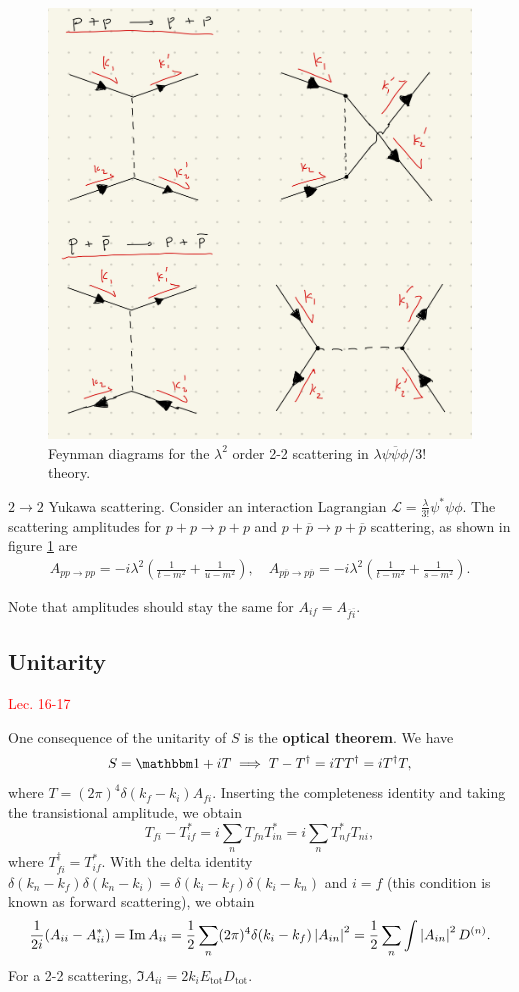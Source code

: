 \documentclass{article}
\begin{document}
\begin{figure}[h]
    \centering
    \includegraphics[width=0.5\linewidth]{images/qft-images/yukawastuchannels.jpg}
    \caption{Feynman diagrams for the $\lambda^2$ order 2-2 scattering in $\lambda\psi\overline\psi\phi/3!$ theory. }
    \label{fig:yukawastuchannels}
\end{figure}

\example $2\to 2$ Yukawa scattering. Consider an interaction Lagrangian $\mathcal L=\frac\lambda{3!}\psi^*\psi\phi$. The scattering amplitudes  for $p+p\to p+p$ and $p+\overline p\to p+\overline p$ scattering, as shown in figure \ref{fig:yukawastuchannels} are 
\begin{align*}
    A_{pp\to pp}=-i\lambda^2\left(\frac 1{t-m^2}+\frac 1{u-m^2}\right),\quad A_{p\overline p\to p\overline p}=-i\lambda^2\left(\frac 1{t-m^2}+\frac 1{s-m^2}\right).
\end{align*}

Note that amplitudes should stay the same for $A_{if}=A_{\overline f\overline i}$.

\subsection{Unitarity}
\textcolor{red}{Lec. 16-17}

One consequence of the unitarity of $S$ is the \textbf{optical theorem}. We have 
$$S=\mathbbm 1+iT\implies T-T^\dag=iTT^\dag=iT^\dag T,$$
where $T=(2\pi)^4\delta(k_f-k_i)A_{fi}.$ Inserting the completeness identity and taking the transistional amplitude, we obtain 
$$T_{fi}-T^*_{if}=i\sum_nT_{fn}T^*_{in}=i\sum_nT^*_{nf}T_{ni},$$
where $T^\dag_{fi}=T^*_{if}$. With the delta identity $\delta(k_n-k_f)\delta(k_n-k_i)=\delta(k_i-k_f)\delta(k_i-k_n)$ and $i=f$ (this condition is known as forward scattering), we obtain
\begin{equation}
    \frac 1{2i}(A_{ii}-A^*_{ii})=\Im A_{ii}=\frac 12\sum_n(2\pi)^4\delta(k_i-k_f)\left\lvert A_{in}\right\rvert^2=\frac 12\sum_n\int\left\lvert A_{in}\right\rvert^2D^{(n)}.
\end{equation}
\example For a 2-2 scattering, $\Im A_{ii}=2k_iE_\text{tot}D_\text{tot}.$
\end{document}
